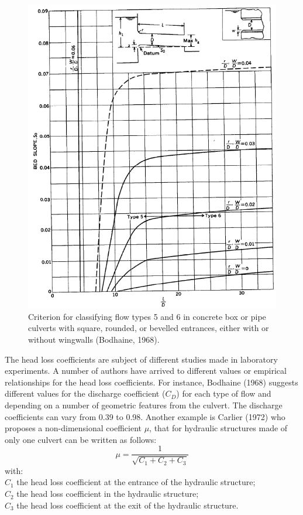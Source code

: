 \begin{figure}[H]
\begin{center}
  \includegraphics[scale=0.5]{culvert_fig4.png}
\end{center}
\caption{Criterion for classifying flow types 5 and 6 in concrete box or pipe culverts 
with square, rounded, or bevelled entrances, either with or without wingwalls (Bodhaine, 1968).}
\label{fig:culvert_fig4}
\end{figure}

The head loss coefficients are subject of different studies made in laboratory experiments. 
A number of authors have arrived to different values or empirical relationships for the 
head loss coefficients. For instance, Bodhaine (1968) suggests different values for 
the discharge coefficient ($C_D$) for each type of flow and depending on a number of 
geometric features from the culvert. The discharge coefficients can vary from 0.39 to 0.98. 
Another example is Carlier (1972) who proposes a non-dimensional coefficient $\mu$, 
that for hydraulic structures made of only one culvert can be written as follows:
\begin{equation}
\mu = \dfrac{1}{\sqrt{C_1+C_2+C_3}}
\end{equation}
with:\\
$C_1$ the head loss coefficient at the entrance of the hydraulic structure;\\
$C_2$ the head loss coefficient in the hydraulic structure;\\
$C_3$ the head loss coefficient at the exit of the hydraulic structure.

